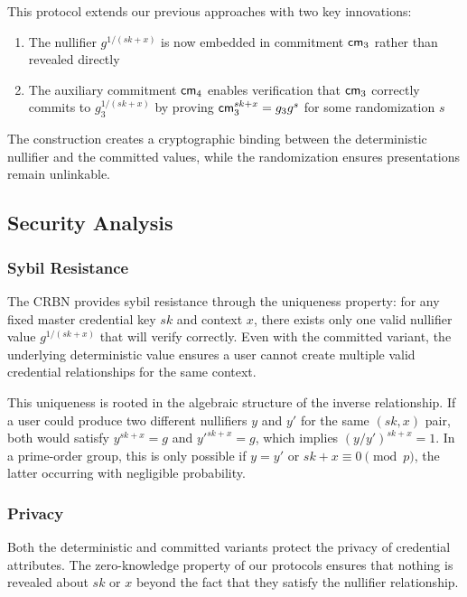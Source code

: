 This protocol extends our previous approaches with two key innovations:
\begin{enumerate}
    \item The nullifier $g^{1/(sk+x)}$ is now embedded in commitment $\mathsf{cm}_3$ rather than revealed directly
    \item The auxiliary commitment $\mathsf{cm}_4$ enables verification that $\mathsf{cm}_3$ correctly commits to $g_3^{1/(sk+x)}$ by proving $\mathsf{cm}_3^{sk+x} = g_3 g^s$ for some randomization $s$
\end{enumerate}

The construction creates a cryptographic binding between the deterministic nullifier and the committed values, while the randomization ensures presentations remain unlinkable.

\subsection{Security Analysis}

\subsubsection{Sybil Resistance}

The CRBN provides sybil resistance through the uniqueness property: for any fixed master credential key $sk$ and context $x$, there exists only one valid nullifier value $g^{1/(sk+x)}$ that will verify correctly. Even with the committed variant, the underlying deterministic value ensures a user cannot create multiple valid credential relationships for the same context.

This uniqueness is rooted in the algebraic structure of the inverse relationship. If a user could produce two different nullifiers $y$ and $y'$ for the same $(sk,x)$ pair, both would satisfy $y^{sk+x} = g$ and $y'^{sk+x} = g$, which implies $(y/y')^{sk+x} = 1$. In a prime-order group, this is only possible if $y = y'$ or $sk+x \equiv 0 \pmod{p}$, the latter occurring with negligible probability.

\subsubsection{Privacy}

Both the deterministic and committed variants protect the privacy of credential attributes. The zero-knowledge property of our protocols ensures that nothing is revealed about $sk$ or $x$ beyond the fact that they satisfy the nullifier relationship.

